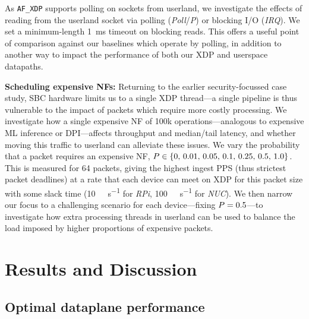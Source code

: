 \documentclass[comsoc, conference, times]{IEEEtran}
\newcommand{\afxdp}{\texttt{AF\_XDP}}
\newcommand{\fakepara}[1]{\noindent\textbf{#1:}}
\begin{document}
As \afxdp{} supports polling on sockets from userland, we investigate the effects of reading from the userland socket via polling (\emph{Poll}/\emph{P}) or blocking I/O (\emph{IRQ}).
We set a minimum-length \qty{1}{\milli\second} timeout on blocking reads.
This offers a useful point of comparison against our baselines which operate by polling, in addition to another way to impact the performance of both our XDP and userspace datapaths.

\fakepara{Scheduling expensive NFs}
Returning to the earlier security-focussed case study, SBC hardware limits us to a single XDP thread---a single pipeline is thus vulnerable to the impact of packets which require more costly processing.
We investigate how a single expensive NF of \num{100}k operations---analogous to expensive ML inference or DPI---affects throughput and median/tail latency, and whether moving this traffic to userland can alleviate these issues.
We vary the probability that a packet requires an expensive NF, $P\in\left\{\text{\numlist[list-final-separator = {, }]{0;0.01;0.05;0.1;0.25;0.5;1.0}}\right\}$.
This is measured for \qty{64}{\byte} packets, giving the highest ingest PPS (thus strictest packet deadlines) at a rate that each device can meet on XDP for this packet size with some slack time (\qty{10}{\mega\bit\per\second} for \emph{RPi}, \qty{100}{\mega\bit\per\second} for \emph{NUC}).
We then narrow our focus to a challenging scenario for each device---fixing $P=\text{\num{0.5}}$---to investigate how extra processing threads in userland can be used to balance the load imposed by higher proportions of expensive packets.

\section{Results and Discussion}\label{sec:results}


\newlength{\resultplotwidth}
\setlength{\resultplotwidth}{0.9\linewidth}


\subsection{Optimal dataplane performance}
\end{document}
